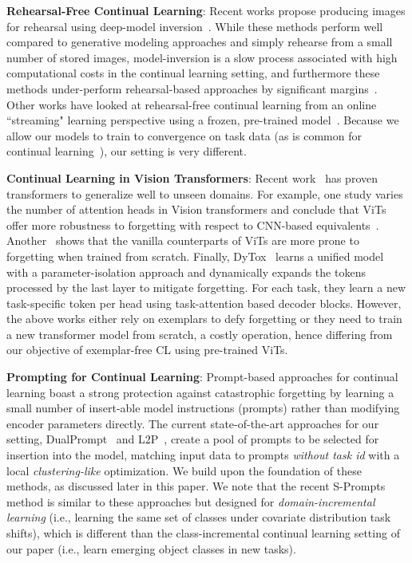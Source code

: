 \noindent
\textbf{Rehearsal-Free Continual Learning}: 
Recent works propose producing images for rehearsal using deep-model inversion~\cite{choi2021dual,gao2022r,smith2021abd,yin2020dreaming}. While these methods perform well compared to generative modeling approaches and simply rehearse from a small number of stored images, model-inversion is a slow process associated with high computational costs in the continual learning setting, and furthermore these methods under-perform rehearsal-based approaches by significant margins~\cite{smith2021abd}. Other works have looked at rehearsal-free continual learning from an online ``streaming" learning perspective using a frozen, pre-trained model~\cite{hayes:2019,lomonaco2020rehearsal}. Because we allow our models to train to convergence on task data (as is common for continual learning~\cite{wu2019large}), our setting is very different. %

\noindent
\textbf{Continual Learning in Vision Transformers}:
Recent work~\cite{brown2020language,li2022technical,yin2019benchmarking} has proven transformers to generalize well to unseen domains. 
For example, one study varies the number of attention heads in Vision transformers and conclude that ViTs offer more robustness to forgetting with respect to CNN-based equivalents~\cite{mirzadeh2022architecture}. Another~\cite{yu2021improving} shows that the vanilla counterparts of ViTs are more prone to forgetting when trained from scratch. Finally, DyTox~\cite{douillard2022dytox} learns a unified model with a parameter-isolation approach and dynamically expands the tokens processed by the last layer to mitigate forgetting. For each task, they learn a new task-specific token per head using task-attention based decoder blocks. However, the above works either rely on exemplars to defy forgetting or they need to train a new transformer model from scratch, a costly operation, hence differing from our objective of exemplar-free CL using pre-trained ViTs.

\noindent
\textbf{Prompting for Continual Learning}: 
Prompt-based approaches for continual learning boast a strong protection against catastrophic forgetting by learning a small number of insert-able model instructions (prompts) rather than modifying encoder parameters directly. The current state-of-the-art approaches
for our setting, DualPrompt~\cite{wang2022dualprompt} and L2P~\cite{wang2022learning}, create a pool of prompts to be selected for insertion into the model, matching input data to prompts \emph{without task id} with a local \emph{clustering-like} optimization. We build upon the foundation of these methods, as discussed later in this paper. We note that the recent S-Prompts~\cite{wang2022sprompt} method is similar to these approaches but designed for \emph{domain-incremental learning} (i.e., learning the same set of classes under covariate distribution task shifts), which is different than the class-incremental continual learning setting of our paper (i.e., learn emerging object classes in new tasks).

